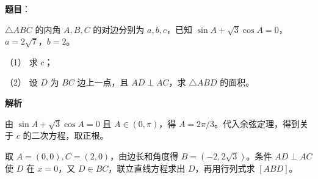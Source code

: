\begin{answer}

\textbf{题目}：

\(\triangle ABC\) 的内角 \(A,B,C\) 的对边分别为 \(a,b,c\)，已知 \(\sin A+\sqrt3\cos A=0\)，\(a=2\sqrt7\)，\(b=2\)。

   （1） 求 \(c\)；

   （2） 设 \(D\) 为 \(BC\) 边上一点，且 \(AD\perp AC\)，求 \(\triangle ABD\) 的面积。

\textbf{解析}


由 \(\sin A+\sqrt3\cos A=0\) 且 \(A\in(0,\pi)\)，得 \(A=2\pi/3\)。代入余弦定理，得到关于 \(c\) 的二次方程，取正根。


取 \(A=(0,0),C=(2,0)\)，由边长和角度得 \(B=(-2,2\sqrt3)\)。条件 \(AD\perp AC\) 使 \(D\) 在 \(x=0\)，又 \(D\in BC\)，联立直线方程求出 \(D\)，再用行列式求 \([ABD]\)。



\end{answer}
